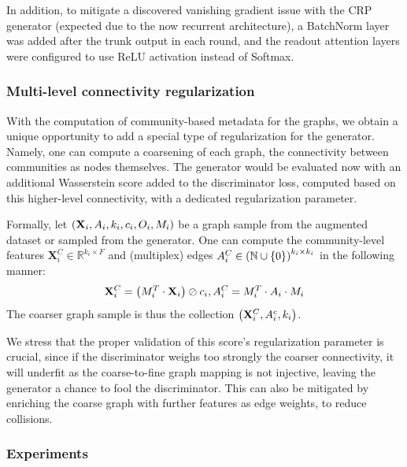 In addition, to mitigate a discovered vanishing gradient issue with the CRP generator (expected due to the now recurrent architecture), a BatchNorm layer was added after the trunk output in each round, and the readout attention layers were configured to use ReLU activation instead of Softmax.

\subsubsection{Multi-level connectivity regularization}
With the computation of community-based metadata for the graphs, we obtain a unique opportunity to add a special type of regularization for the generator. Namely, one can compute a coarsening of each graph, the connectivity between communities as nodes themselves. The generator would be evaluated now with an additional Wasserstein score added to the discriminator loss, computed based on this higher-level connectivity, with a dedicated regularization parameter. 

Formally, let $\mathopen{}\left(\mathbf{X}_i, A_i, k_i, c_i, O_i, M_i\right)$ be a graph sample from the augmented dataset or sampled from the generator. One can compute the community-level features $\mathbf{X}^C_i \in \mathbb{R}^{k_i \times F}$ and (multiplex) edges $A^C_i \in \mathopen{}\left(\mathbb{N} \cup \mathopen{}\left\{0\right\}\right)^{k_i \times k_i}$ in the following manner: $$\mathbf{X}^C_i = \mathopen{}\left(M^T_i \cdot \mathbf{X}_i\right) \oslash c_i, A^C_i = M^T_i \cdot A_i \cdot M_i$$
The coarser graph sample is thus the collection $\mathopen{}\left(\mathbf{X}^C_i, A^c_i, k_i\right)$.

We stress that the proper validation of this score's regularization parameter is crucial, since if the discriminator weighs too strongly the coarser connectivity, it will underfit as the coarse-to-fine graph mapping is not injective, leaving the generator a chance to fool the discriminator. This can also be mitigated by enriching the coarse graph with further features as edge weights, to reduce collisions.


\subsubsection{Experiments}

